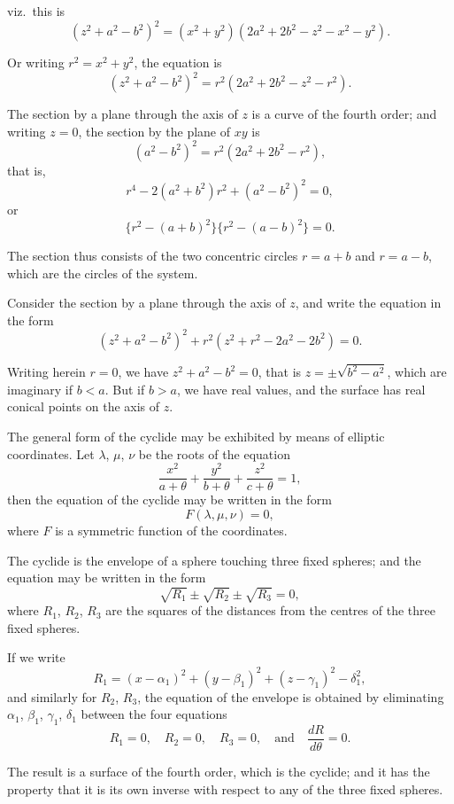 \documentclass[11pt,a4paper]{book}
\begin{document}
\newpage

viz.\ this is
\[
(z^2 + a^2 - b^2)^2 = (x^2 + y^2)(2a^2 + 2b^2 - z^2 - x^2 - y^2).
\]

Or writing $r^2 = x^2 + y^2$, the equation is
\[
(z^2 + a^2 - b^2)^2 = r^2(2a^2 + 2b^2 - z^2 - r^2).
\]

The section by a plane through the axis of $z$ is a curve of the fourth order; and writing $z = 0$, the section by the plane of $xy$ is
\[
(a^2 - b^2)^2 = r^2(2a^2 + 2b^2 - r^2),
\]
that is,
\[
r^4 - 2(a^2 + b^2)r^2 + (a^2 - b^2)^2 = 0,
\]
or
\[
\{r^2 - (a + b)^2\}\{r^2 - (a - b)^2\} = 0.
\]

The section thus consists of the two concentric circles $r = a + b$ and $r = a - b$, which are the circles of the system.

\newpage

Consider the section by a plane through the axis of $z$, and write the equation in the form
\[
(z^2 + a^2 - b^2)^2 + r^2(z^2 + r^2 - 2a^2 - 2b^2) = 0.
\]

Writing herein $r = 0$, we have $z^2 + a^2 - b^2 = 0$, that is $z = \pm\sqrt{b^2 - a^2}$, which are imaginary if $b < a$. But if $b > a$, we have real values, and the surface has real conical points on the axis of $z$.

The general form of the cyclide may be exhibited by means of elliptic coordinates. Let $\lambda$, $\mu$, $\nu$ be the roots of the equation
\[
\frac{x^2}{a + \theta} + \frac{y^2}{b + \theta} + \frac{z^2}{c + \theta} = 1,
\]
then the equation of the cyclide may be written in the form
\[
F(\lambda, \mu, \nu) = 0,
\]
where $F$ is a symmetric function of the coordinates.

\newpage

The cyclide is the envelope of a sphere touching three fixed spheres; and the equation may be written in the form
\[
\sqrt{R_1} \pm \sqrt{R_2} \pm \sqrt{R_3} = 0,
\]
where $R_1$, $R_2$, $R_3$ are the squares of the distances from the centres of the three fixed spheres.

If we write
\[
R_1 = (x - \alpha_1)^2 + (y - \beta_1)^2 + (z - \gamma_1)^2 - \delta_1^2,
\]
and similarly for $R_2$, $R_3$, the equation of the envelope is obtained by eliminating $\alpha_1$, $\beta_1$, $\gamma_1$, $\delta_1$ between the four equations
\[
R_1 = 0, \quad R_2 = 0, \quad R_3 = 0, \quad \text{and} \quad \frac{dR}{d\theta} = 0.
\]

The result is a surface of the fourth order, which is the cyclide; and it has the property that it is its own inverse with respect to any of the three fixed spheres.
\end{document}

